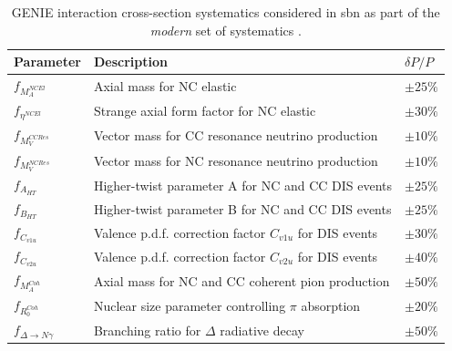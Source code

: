 \begin{table}[h!]
    \renewcommand{\arraystretch}{1.4}
    \begin{tabular}{p{1.8cm} p{10cm}>{\centering\arraybackslash}p{ 2.2cm}}
        \toprule
         Parameter & Description & $\delta P / P$ \\
        \midrule
         $f_{M_{A}^{NCEl}}$  & Axial mass for NC elastic & $\pm 25\%$ \\
         
         $f_{\eta^{NCEl}}$    & Strange axial form factor for NC elastic & $\pm 30\%$ \\
        
         
         $f_{M_{V}^{CCRes}}$ & Vector mass for CC resonance neutrino production & $\pm 10\%$ \\
         
         $f_{M_{V}^{NCRes}}$ & Vector mass for NC resonance neutrino production & $\pm 10\%$ \\
         
         $f_{A_{HT}}$          & Higher-twist parameter A for NC and CC DIS events & $\pm 25\%$ \\
         
         $f_{B_{HT}}$          & Higher-twist parameter B for NC and CC DIS events & $\pm 25\%$ \\
         
         $f_{C_{v1u}}$         & Valence p.d.f. correction factor $C_{v1u}$ for DIS events & $\pm 30\%$ \\
         
         $f_{C_{v2u}}$         & Valence p.d.f. correction factor $C_{v2u}$ for DIS events & $\pm 40\%$ \\
         
         $f_{M_{A}^{Coh}}$     & Axial mass for NC and CC coherent pion production & $ \pm 50 \%$ \\
         
         $f_{R_{0}^{Coh}}$     & Nuclear size parameter controlling $\pi$ absorption & $\pm 20 \%$ \\
        
        $f_{\Delta\rightarrow N\gamma}$   & Branching ratio for $\Delta$ radiative decay & $\pm 50 \%$ \\
        
        \bottomrule
        
    \end{tabular}
    \caption[Modern interaction cross-section systematic parameters]{GENIE interaction cross-section systematics considered in \gls{sbn} as part of the \textit{modern} set of systematics \cite{GENIE_manual}.}

    \label{}
\end{table}


